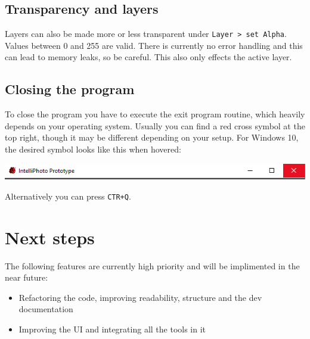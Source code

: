 \documentclass[a4paper, 12pt]{article}
\begin{document}
\subsection{Transparency and layers}
Layers can also be made more or less transparent under \texttt{Layer > set Alpha}. Values between 0 and 255 are valid. There is currently no error handling and this can lead to memory leaks, so be careful. This also only effects the active layer.

\subsection{Closing the program}
To close the program you have to execute the exit program routine, which heavily depends on your operating system. Usually you can find a red cross symbol at the top right, though it may be different depending on your setup.
For Windows 10, the desired symbol looks like this when hovered:
\begin{center}
\includegraphics[width=0.9\linewidth,keepaspectratio]{assets/close-window}
\end{center}
Alternatively you can press \texttt{CTR+Q}.

\section{Next steps}
The following features are currently high priority and will be implimented in the near future:
\begin{itemize}
\item Refactoring the code, improving readability, structure and the dev documentation
\item Improving the UI and integrating all the tools in it
\end{itemize}
\end{document}
